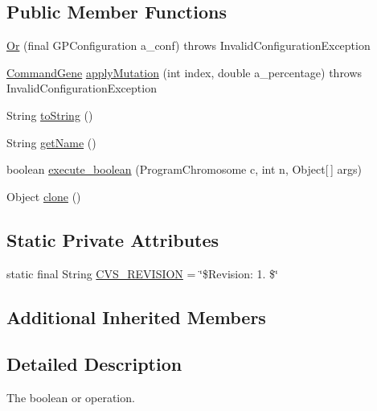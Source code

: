 \subsection*{Public Member Functions}
\begin{DoxyCompactItemize}
\item 
\hyperlink{classorg_1_1jgap_1_1gp_1_1function_1_1_or_a805ca20ff49fd8deabaddf779746cf09}{Or} (final G\-P\-Configuration a\-\_\-conf)  throws Invalid\-Configuration\-Exception 
\item 
\hyperlink{classorg_1_1jgap_1_1gp_1_1_command_gene}{Command\-Gene} \hyperlink{classorg_1_1jgap_1_1gp_1_1function_1_1_or_a6d61234e177438cb76709a9d6a93e361}{apply\-Mutation} (int index, double a\-\_\-percentage)  throws Invalid\-Configuration\-Exception 
\item 
String \hyperlink{classorg_1_1jgap_1_1gp_1_1function_1_1_or_a43ec0031e4646d82fb662191fc379ad3}{to\-String} ()
\item 
String \hyperlink{classorg_1_1jgap_1_1gp_1_1function_1_1_or_a3ec60520e57f417660cee96265c49304}{get\-Name} ()
\item 
boolean \hyperlink{classorg_1_1jgap_1_1gp_1_1function_1_1_or_a8efc7e490bdd616011f8163452dde7b3}{execute\-\_\-boolean} (Program\-Chromosome c, int n, Object\mbox{[}$\,$\mbox{]} args)
\item 
Object \hyperlink{classorg_1_1jgap_1_1gp_1_1function_1_1_or_a1783898bf86b7d6dd4a80731d6aa4f5f}{clone} ()
\end{DoxyCompactItemize}
\subsection*{Static Private Attributes}
\begin{DoxyCompactItemize}
\item 
static final String \hyperlink{classorg_1_1jgap_1_1gp_1_1function_1_1_or_ab0cd66f26e1a633b428cc62e7355d3b8}{C\-V\-S\-\_\-\-R\-E\-V\-I\-S\-I\-O\-N} = \char`\"{}\$Revision\-: 1. \$\char`\"{}
\end{DoxyCompactItemize}
\subsection*{Additional Inherited Members}


\subsection{Detailed Description}
The boolean or operation.

